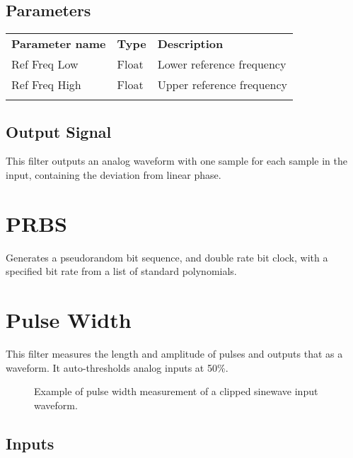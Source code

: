 \subsection{Parameters}

\begin{tabularx}{16cm}{llX}
\thickhline
\textbf{Parameter name} & \textbf{Type} & \textbf{Description} \\
\thickhline
Ref Freq Low & Float & Lower reference frequency\\
\thinhline
Ref Freq High & Float & Upper reference frequency\\
\thickhline
\end{tabularx}

\subsection{Output Signal}

This filter outputs an analog waveform with one sample for each sample in the input, containing the deviation from
linear phase.

\pagebreak
\section{PRBS}

Generates a pseudorandom bit sequence, and double rate bit clock, with a specified bit rate from a list of standard
polynomials.

\pagebreak
\section{Pulse Width}
\label{filter:pulsewidth}

This filter measures the length and amplitude of pulses and outputs that as a waveform. It auto-thresholds analog inputs at 50\%.

\begin{figure}[h]
\centering
{}
\caption{Example of pulse width measurement of a clipped sinewave input waveform.}
\label{filter_pulsewidth}
\end{figure}

\subsection{Inputs}

